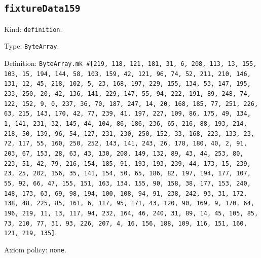 \documentclass[11pt]{article}
\begin{document}
\subsection*{\texttt{fixtureData159}}
\noindent Kind: \texttt{definition}.\par
\noindent Type: \texttt{ByteArray}.\par
\noindent Definition: \texttt{ByteArray.mk \#[219, 118, 121, 181, 31, 6, 208, 113, 13, 155, 103, 15, 194, 144, 58, 103, 159, 42, 121, 96, 74, 52, 211, 210, 146, 131, 12, 45, 218, 102, 5, 23, 168, 197, 229, 155, 134, 53, 147, 195, 233, 250, 20, 42, 136, 141, 229, 147, 55, 94, 222, 191, 89, 248, 74, 122, 152, 9, 0, 237, 36, 70, 187, 247, 14, 20, 168, 185, 77, 251, 226, 63, 215, 143, 170, 42, 77, 239, 41, 197, 227, 109, 86, 175, 49, 134, 1, 141, 231, 32, 145, 44, 104, 86, 186, 236, 65, 216, 88, 193, 214, 218, 50, 139, 96, 54, 127, 231, 230, 250, 152, 33, 168, 223, 133, 23, 72, 117, 55, 160, 250, 252, 143, 141, 243, 26, 178, 180, 40, 2, 91, 203, 67, 153, 28, 63, 43, 130, 208, 149, 132, 89, 43, 44, 253, 80, 223, 51, 42, 79, 216, 154, 185, 91, 193, 193, 239, 44, 173, 15, 239, 23, 25, 202, 156, 35, 141, 154, 50, 65, 186, 82, 197, 194, 177, 107, 55, 92, 66, 47, 155, 151, 163, 134, 155, 90, 158, 38, 177, 153, 240, 148, 173, 63, 69, 98, 194, 100, 108, 94, 91, 238, 242, 93, 31, 172, 138, 48, 225, 85, 161, 6, 117, 95, 171, 43, 120, 90, 169, 9, 170, 64, 196, 219, 11, 13, 117, 94, 232, 164, 46, 240, 31, 89, 14, 45, 105, 85, 73, 210, 77, 31, 93, 226, 207, 4, 16, 156, 188, 109, 116, 151, 160, 121, 219, 135]}.\par
\noindent Axiom policy: \texttt{none}.\par
\end{document}
